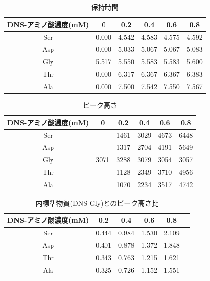 \documentclass[a4paper,papersize,dvipdfmx]{jsarticle}
\begin{document}
\begin{table}[H]
\begin{center}
\begin{tabular}{|c|c|c|c|c|c|}
\hline
DNS-アミノ酸濃度(mM) & 0     & 0.2   & 0.4   & 0.6   & 0.8   \\ \hline
Ser            & 0.000 & 4.542 & 4.583 & 4.575 & 4.592 \\ \hline
Asp            & 0.000 & 5.033 & 5.067 & 5.067 & 5.083 \\ \hline
Gly            & 5.517 & 5.550 & 5.583 & 5.583 & 5.600 \\ \hline
Thr            & 0.000 & 6.317 & 6.367 & 6.367 & 6.383 \\ \hline
Ala            & 0.000 & 7.500 & 7.542 & 7.550 & 7.567 \\ \hline
\end{tabular}
\caption{保持時間}
\end{center}
\end{table}

\begin{table}[H]
\begin{center}
\begin{tabular}{|c|c|c|c|c|c|}
\hline
DNS-アミノ酸濃度(mM) & 0    & 0.2  & 0.4  & 0.6  & 0.8  \\ \hline
Ser            &      & 1461 & 3029 & 4673 & 6448 \\ \hline
Asp            &      & 1317 & 2704 & 4191 & 5649 \\ \hline
Gly            & 3071 & 3288 & 3079 & 3054 & 3057 \\ \hline
Thr            &      & 1128 & 2349 & 3710 & 4956 \\ \hline
Ala            &      & 1070 & 2234 & 3517 & 4742 \\ \hline
\end{tabular}
\caption{ピーク高さ}
\end{center}
\end{table}


\begin{table}[H]
\begin{center}
\begin{tabular}{|c|c|c|c|c|c|}
\hline
DNS-アミノ酸濃度(mM)  & 0.2   & 0.4   & 0.6   & 0.8   \\ \hline
Ser              & 0.444 & 0.984 & 1.530 & 2.109 \\ \hline
Asp              & 0.401 & 0.878 & 1.372 & 1.848 \\ \hline
Thr              & 0.343 & 0.763 & 1.215 & 1.621 \\ \hline
Ala              & 0.325 & 0.726 & 1.152 & 1.551 \\ \hline
\end{tabular}
\caption{内標準物質(DNS-Gly)とのピーク高さ比}
\end{center}
\end{table}
\end{document}
